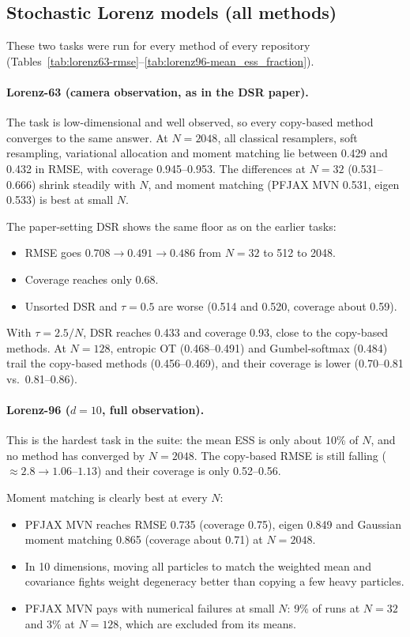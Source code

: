 \subsection*{Stochastic Lorenz models (all methods)}

These two tasks were run for every method of every repository (Tables~\ref{tab:lorenz63-rmse}--\ref{tab:lorenz96-mean_ess_fraction}).

\paragraph{Lorenz-63 (camera observation, as in the DSR paper).}
The task is low-dimensional and well observed, so every copy-based method converges to the same answer. At $N{=}2048$, all classical resamplers, soft resampling, variational allocation and moment matching lie between 0.429 and 0.432 in RMSE, with coverage 0.945--0.953. The differences at $N{=}32$ (0.531--0.666) shrink steadily with $N$, and moment matching (PFJAX MVN 0.531, eigen 0.533) is best at small $N$.

The paper-setting DSR shows the same floor as on the earlier tasks:
\begin{itemize}
\item RMSE goes $0.708\to0.491\to0.486$ from $N{=}32$ to 512 to 2048.
\item Coverage reaches only 0.68.
\item Unsorted DSR and $\tau{=}0.5$ are worse (0.514 and 0.520, coverage about 0.59).
\end{itemize}
With $\tau{=}2.5/N$, DSR reaches 0.433 and coverage 0.93, close to the copy-based methods. At $N{=}128$, entropic OT (0.468--0.491) and Gumbel-softmax (0.484) trail the copy-based methods (0.456--0.469), and their coverage is lower (0.70--0.81 vs.\ 0.81--0.86).

\paragraph{Lorenz-96 ($d{=}10$, full observation).}
This is the hardest task in the suite: the mean ESS is only about 10\% of $N$, and no method has converged by $N{=}2048$. The copy-based RMSE is still falling ($\approx2.8\to1.06$--$1.13$) and their coverage is only 0.52--0.56.

Moment matching is clearly best at every $N$:
\begin{itemize}
\item PFJAX MVN reaches RMSE 0.735 (coverage 0.75), eigen 0.849 and Gaussian moment matching 0.865 (coverage about 0.71) at $N{=}2048$.
\item In 10 dimensions, moving all particles to match the weighted mean and covariance fights weight degeneracy better than copying a few heavy particles.
\item PFJAX MVN pays with numerical failures at small $N$: 9\% of runs at $N{=}32$ and 3\% at $N{=}128$, which are excluded from its means.
\end{itemize}

